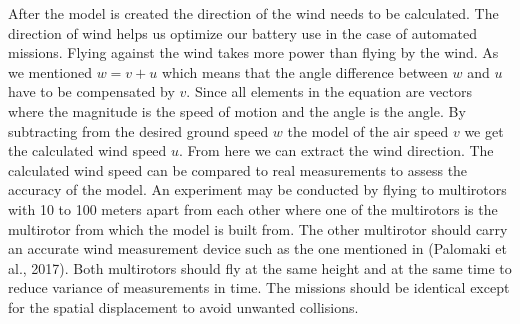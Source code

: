 \documentclass[12pt,oneside]{reedthesis}
\theoremstyle{definition}
\theoremstyle{definition}
\theoremstyle{definition}
\theoremstyle{remark}
\begin{document}
After the model is created the direction of the wind needs to be
calculated. The direction of wind helps us optimize our battery use in
the case of automated missions. Flying against the wind takes more power
than flying by the wind. As we mentioned \(w = v + u\) which means that
the angle difference between \(w\) and \(u\) have to be compensated by
\(v\). Since all elements in the equation are vectors where the
magnitude is the speed of motion and the angle is the angle. By
subtracting from the desired ground speed \(w\) the model of the air
speed \(v\) we get the calculated wind speed \(u\). From here we can
extract the wind direction. The calculated wind speed can be compared to
real measurements to assess the accuracy of the model. An experiment may
be conducted by flying to multirotors with 10 to 100 meters apart from
each other where one of the multirotors is the multirotor from which the
model is built from. The other multirotor should carry an accurate wind
measurement device such as the one mentioned in (Palomaki et al., 2017).
Both multirotors should fly at the same height and at the same time to
reduce variance of measurements in time. The missions should be
identical except for the spatial displacement to avoid unwanted
collisions.
\end{document}
